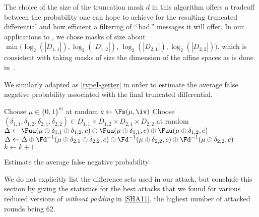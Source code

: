   The choice of the size of the truncation mask $d$ in this algorithm
  offers a tradeoff between the probability one can hope to achieve for the resulting truncated differential
  and how efficient a filtering of ``\,bad\,'' messages it will offer.
  In our applications to \shaone, we chose masks of size about
  $\min(\log_2(|D_{1,1}|), \log_2(|D_{1,2}|)$, $\log_2(|D_{2,1}|), \log_2(|D_{2,2}|))$,
  which is consistent with taking masks of size the dimension of the affine
  spaces as is done in~\cite{DBLP:conf/crypto/KnellwolfK12}.

  \medskip

  We similarly adapted \cite[Algorithm 3]{DBLP:conf/crypto/KnellwolfK12} as \autoref{typeI-getter} in order to estimate the average
  false negative probability associated with the final truncated differential.

  \begin{algorithm}[ht]
        \LinesNumbered

    {
      Choose $\mu \in \{0,1\}^m$ at random \;
      $c \leftarrow \Fs(\mu, \iv)$\;
      Choose $(\delta_{1,1},\delta_{1,2},\delta_{2,1},\delta_{2,2}) \in D_{1,1} \times D_{1,2} \times D_{2,1} \times D_{2,2} $ at random\; 
      $\Delta \leftarrow 
      \Fuu (\mu \oplus \delta_{1,1} \oplus \delta_{1,2} , c) \oplus 
      \Fuu (\mu \oplus \delta_{1,1} , c) \oplus 
      \Fuu(\mu \oplus \delta_{1,2},c)$\;
      $\Delta \leftarrow \Delta \oplus
      \Fd^{-1} (\mu \oplus \delta_{2,1} \oplus \delta_{2,2}, c) \oplus 
      \Fd^{-1}(\mu \oplus \delta_{2,2} , c) \oplus 
      \Fd^{-1} (\mu \oplus \delta_{2,2} , c) $\;
      {
        {
          $k \leftarrow k+1$\;
        }
      }
    }
    \caption{\label{typeI-getter}Estimate the average false negative probability}
  \end{algorithm}

\bigskip

  We do not explicitly list the difference sets used in our attack, but conclude this section by giving the statistics for the best attacks that we found for
  various reduced versions of \shaone \emph{without padding} in \autoref{SHA11}, the highest number of
  attacked rounds being 62.

